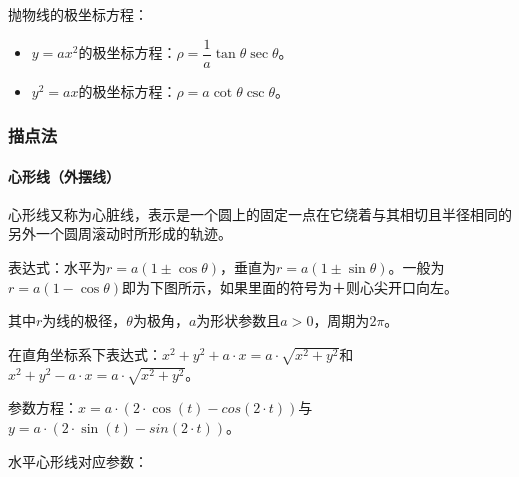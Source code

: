 \documentclass[UTF8, 12pt]{ctexart}
\begin{document}
        抛物线的极坐标方程：

        \begin{itemize}
            \item $y=ax^2$的极坐标方程：$\rho=\dfrac{1}{a}\tan\theta\sec\theta$。
            \item $y^2=ax$的极坐标方程：$\rho=a\cot\theta\csc\theta$。
        \end{itemize}

        \subsubsection{描点法}
        \paragraph{心形线（外摆线）} \leavevmode \medskip

        \begin{minipage}{0.55\linewidth}
            心形线又称为心脏线，表示是一个圆上的固定一点在它绕着与其相切且半径相同的另外一个圆周滚动时所形成的轨迹。

            表达式：水平为$r=a(1\pm\cos\theta)$，垂直为$r=a(1\pm\sin\theta)$。一般为$r=a(1-\cos\theta)$即为下图所示，如果里面的符号为＋则心尖开口向左。

            其中$r$为线的极径，$\theta$为极角，$a$为形状参数且$a>0$，周期为$2\pi$。
        \end{minipage}
        \hfill
        \begin{minipage}{0.35\linewidth}
        \end{minipage}

        在直角坐标系下表达式：$x^2+y^2+a\cdot x=a\cdot\sqrt{x^2+y^2}$和$x^2+y^2-a\cdot x=a\cdot\sqrt{x^2+y^2}$。

        参数方程：$x=a\cdot(2\cdot\cos(t)-cos(2\cdot t))$与$y=a\cdot(2\cdot\sin(t)-sin(2\cdot t))$。

        水平心形线对应参数： \leavevmode \medskip
\end{document}
